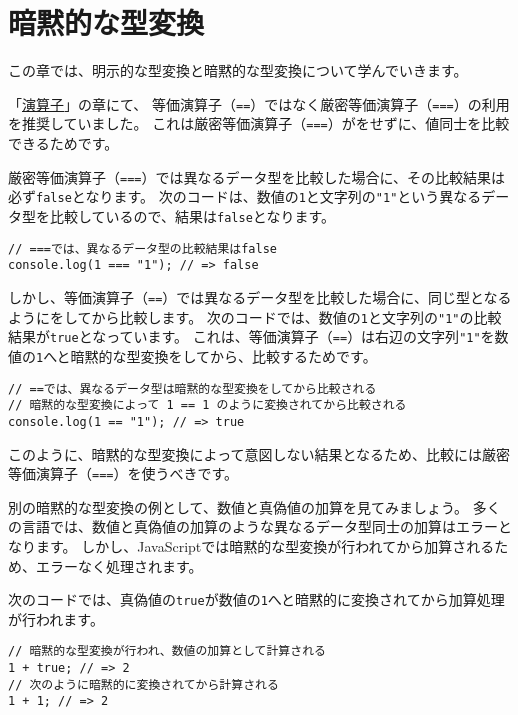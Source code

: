 \hypertarget{implicit-coercion}{%
\chapter{暗黙的な型変換}\label{implicit-coercion}}
\thispagestyle{frontheadings}

この章では、明示的な型変換と暗黙的な型変換について学んでいきます。

「\hyperlink{operator}{演算子}」の章にて、
等価演算子（\texttt{==}）ではなく厳密等価演算子（\texttt{===}）の利用を推奨していました。
これは厳密等価演算子（\texttt{===}）が\textbf{}をせずに、値同士を比較できるためです。

厳密等価演算子（\texttt{===}）では異なるデータ型を比較した場合に、その比較結果は必ず\texttt{false}となります。
次のコードは、数値の\texttt{1}と文字列の\texttt{"1"}という異なるデータ型を比較しているので、結果は\texttt{false}となります。

\begin{lstlisting}
// ===では、異なるデータ型の比較結果はfalse
console.log(1 === "1"); // => false
\end{lstlisting}

しかし、等価演算子（\texttt{==}）では異なるデータ型を比較した場合に、同じ型となるように\textbf{}をしてから比較します。
次のコードでは、数値の\texttt{1}と文字列の\texttt{"1"}の比較結果が\texttt{true}となっています。
これは、等価演算子（\texttt{==}）は右辺の文字列\texttt{"1"}を数値の\texttt{1}へと暗黙的な型変換をしてから、比較するためです。

\begin{lstlisting}
// ==では、異なるデータ型は暗黙的な型変換をしてから比較される
// 暗黙的な型変換によって 1 == 1 のように変換されてから比較される
console.log(1 == "1"); // => true
\end{lstlisting}

このように、暗黙的な型変換によって意図しない結果となるため、比較には厳密等価演算子（\texttt{===}）を使うべきです。

別の暗黙的な型変換の例として、数値と真偽値の加算を見てみましょう。
多くの言語では、数値と真偽値の加算のような異なるデータ型同士の加算はエラーとなります。
しかし、JavaScriptでは暗黙的な型変換が行われてから加算されるため、エラーなく処理されます。

次のコードでは、真偽値の\texttt{true}が数値の\texttt{1}へと暗黙的に変換されてから加算処理が行われます。

\begin{lstlisting}
// 暗黙的な型変換が行われ、数値の加算として計算される
1 + true; // => 2
// 次のように暗黙的に変換されてから計算される
1 + 1; // => 2
\end{lstlisting}

